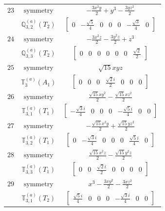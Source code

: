 \documentclass[fleqn,8pt,landscape]{jsarticle}
\begin{document}
\begin{longtable}{ccc}
$ 23 $ & $ \text{symmetry} $ & $ - \frac{3 x^{2} y}{2} + y^{3} - \frac{3 y z^{2}}{2} $ \\
$  $ & $ \mathbb{Q}_{3,2}^{(a)}(T_{2}) $ & $ \begin{bmatrix} 0 & - \frac{\sqrt{5}}{4} & 0 & 0 & 0 & - \frac{\sqrt{3}}{4} & 0 \end{bmatrix} $ \\ \hline
$ 24 $ & $ \text{symmetry} $ & $ - \frac{3 x^{2} z}{2} - \frac{3 y^{2} z}{2} + z^{3} $ \\
$  $ & $ \mathbb{Q}_{3,3}^{(a)}(T_{2}) $ & $ \begin{bmatrix} 0 & 0 & 0 & 0 & 0 & 0 & \frac{\sqrt{2}}{2} \end{bmatrix} $ \\ \hline
$ 25 $ & $ \text{symmetry} $ & $ \sqrt{15} x y z $ \\
$  $ & $ \mathbb{T}_{3}^{(a)}(A_{1}) $ & $ \begin{bmatrix} 0 & 0 & 0 & \frac{\sqrt{2} i}{2} & 0 & 0 & 0 \end{bmatrix} $ \\ \hline
$ 26 $ & $ \text{symmetry} $ & $ \frac{\sqrt{15} x y^{2}}{2} - \frac{\sqrt{15} x z^{2}}{2} $ \\
$  $ & $ \mathbb{T}_{3,1}^{(a)}(T_{1}) $ & $ \begin{bmatrix} - \frac{\sqrt{3} i}{4} & 0 & 0 & 0 & - \frac{\sqrt{5} i}{4} & 0 & 0 \end{bmatrix} $ \\ \hline
$ 27 $ & $ \text{symmetry} $ & $ - \frac{\sqrt{15} x^{2} y}{2} + \frac{\sqrt{15} y z^{2}}{2} $ \\
$  $ & $ \mathbb{T}_{3,2}^{(a)}(T_{1}) $ & $ \begin{bmatrix} 0 & - \frac{\sqrt{3} i}{4} & 0 & 0 & 0 & \frac{\sqrt{5} i}{4} & 0 \end{bmatrix} $ \\ \hline
$ 28 $ & $ \text{symmetry} $ & $ \frac{\sqrt{15} x^{2} z}{2} - \frac{\sqrt{15} y^{2} z}{2} $ \\
$  $ & $ \mathbb{T}_{3,3}^{(a)}(T_{1}) $ & $ \begin{bmatrix} 0 & 0 & \frac{\sqrt{2} i}{2} & 0 & 0 & 0 & 0 \end{bmatrix} $ \\ \hline
$ 29 $ & $ \text{symmetry} $ & $ x^{3} - \frac{3 x y^{2}}{2} - \frac{3 x z^{2}}{2} $ \\
$  $ & $ \mathbb{T}_{3,1}^{(a)}(T_{2}) $ & $ \begin{bmatrix} \frac{\sqrt{5} i}{4} & 0 & 0 & 0 & - \frac{\sqrt{3} i}{4} & 0 & 0 \end{bmatrix} $ \\ \hline

\end{longtable}
\end{document}
